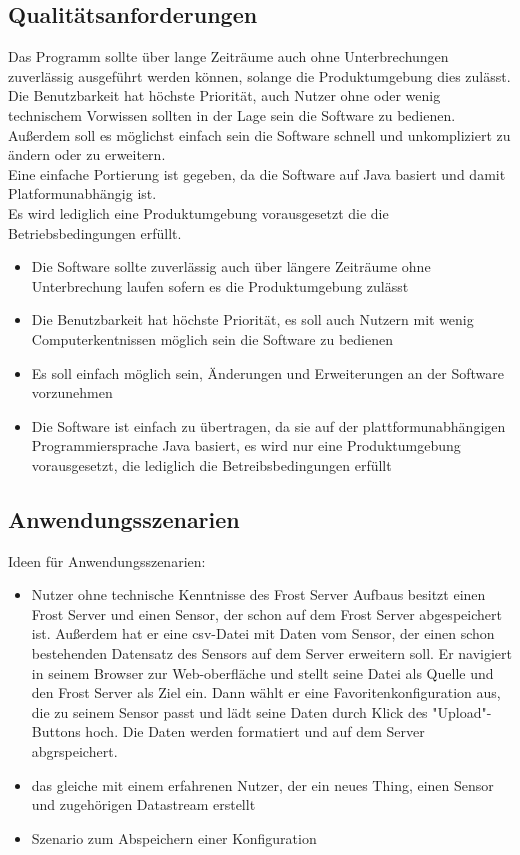 \documentclass[12 pt]{article}
\begin{document}
	
	\subsection{Qualitätsanforderungen}
	Das Programm sollte über lange Zeiträume auch ohne Unterbrechungen zuverlässig ausgeführt werden können, solange die Produktumgebung dies zulässt.
	Die Benutzbarkeit hat höchste Priorität, auch Nutzer ohne oder wenig technischem Vorwissen sollten in der Lage sein die Software zu bedienen.
	\\Außerdem soll es möglichst einfach sein die Software schnell und unkompliziert zu ändern oder zu erweitern.
	\\Eine einfache Portierung ist gegeben, da die Software auf Java basiert und damit Platformunabhängig ist. 
	\\Es wird lediglich eine Produktumgebung vorausgesetzt die die Betriebsbedingungen erfüllt.
	
	\begin{itemize}
		\item Die Software sollte zuverlässig auch über längere Zeiträume ohne Unterbrechung laufen sofern es die Produktumgebung zulässt
		\item Die Benutzbarkeit hat höchste Priorität, es soll auch Nutzern mit wenig Computerkentnissen möglich sein die Software zu bedienen
		\item Es soll einfach möglich sein, Änderungen und Erweiterungen an der Software vorzunehmen
		\item Die Software ist einfach zu übertragen, da sie auf der plattformunabhängigen Programmiersprache Java basiert, es wird nur eine Produktumgebung vorausgesetzt, die lediglich die Betreibsbedingungen erfüllt
	\end{itemize}
	
	\subsection{Anwendungsszenarien}
	Ideen für Anwendungsszenarien:
	\begin{itemize}
		\item Nutzer ohne technische Kenntnisse des Frost Server Aufbaus besitzt einen Frost Server und einen Sensor, der schon auf dem Frost Server abgespeichert ist. Außerdem hat er eine csv-Datei mit Daten vom Sensor, der einen schon bestehenden Datensatz des Sensors auf dem Server erweitern soll. Er navigiert in seinem Browser zur Web-oberfläche und stellt seine Datei als Quelle und den Frost Server als Ziel ein. Dann wählt er eine Favoritenkonfiguration aus, die zu seinem Sensor passt und lädt seine Daten durch Klick des "Upload"-Buttons hoch. Die Daten werden formatiert und auf dem Server abgrspeichert.
		\item das gleiche mit einem erfahrenen Nutzer, der ein neues Thing, einen Sensor und zugehörigen Datastream erstellt
		\item Szenario zum Abspeichern einer Konfiguration
	\end{itemize}
	
\end{document}
